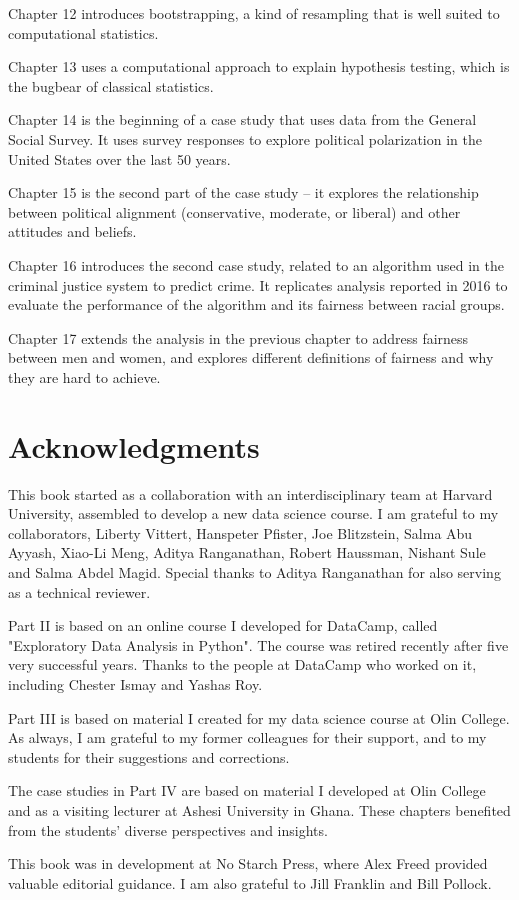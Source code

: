 \begin{description}
\item Chapter 12 introduces bootstrapping, a kind of resampling that is
well suited to computational statistics.

\item Chapter 13 uses a computational approach to explain hypothesis testing, which is the bugbear of classical statistics.

\item Chapter 14 is the beginning of a case study that uses data from the General Social Survey. It uses survey responses to explore political polarization in the United States over the last 50 years.

\item Chapter 15 is the second part of the case study -- it explores the relationship between political alignment (conservative, moderate, or liberal) and other attitudes and beliefs.

\item Chapter 16 introduces the second case study, related to an algorithm used in the criminal justice system to predict crime. It replicates analysis reported in 2016 to evaluate the performance of the algorithm and its fairness between racial groups.

\item Chapter 17 extends the analysis in the previous chapter to address fairness between men and women, and explores different definitions of fairness and why they are hard to achieve.

\section*{Acknowledgments}

This book started as a collaboration with an interdisciplinary team at Harvard University, assembled to develop a new data science course. I am grateful to my collaborators, Liberty Vittert, Hanspeter Pfister, Joe Blitzstein, Salma Abu Ayyash, Xiao-Li Meng, Aditya Ranganathan, Robert Haussman, Nishant Sule and Salma Abdel Magid. Special thanks to Aditya Ranganathan for also serving as a technical reviewer.

Part II is based on an online course I developed for DataCamp, called "Exploratory Data Analysis in Python". The course was retired recently after five very successful years. Thanks to the people at DataCamp who worked on it, including Chester Ismay and Yashas Roy.

Part III is based on material I created for my data science course at Olin College. As always, I am grateful to my former colleagues for their support, and to my students for their suggestions and corrections.

The case studies in Part IV are based on material I developed at Olin College and as a visiting lecturer at Ashesi University in Ghana. These chapters benefited from the students' diverse perspectives and insights.

This book was in development at No Starch Press, where Alex Freed provided valuable editorial guidance. I am also grateful to Jill Franklin and Bill Pollock.

\end{description}
